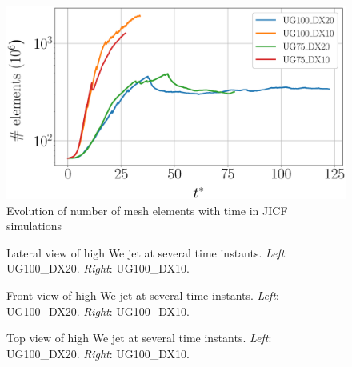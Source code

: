 \begin{figure}[ht]
\centering
	\centering
   \includegraphics[scale=0.25]{./part2_developments/figures_ch5_resolved_JICF/JICF_nelem_increase}
\caption{Evolution of number of mesh elements with time in JICF simulations}
\label{fig:JICF_nelem_increase}
\end{figure}

\clearpage

\begin{figure}[ht]
\centering
{}
\caption[Lateral view of high We jet at several time instants. ]{Lateral view of high We jet at several time instants. \textsl{Left}: UG100\_DX20. \textsl{Right}: UG100\_DX10.}
\label{fig:JICF_establishment_UG100_lateral}
\end{figure}

\clearpage

\begin{figure}[ht]
\centering
{}
\caption[Front view of high We jet at several time instants. ]{Front view of high We jet at several time instants. \textsl{Left}: UG100\_DX20. \textsl{Right}: UG100\_DX10.}
\label{fig:JICF_establishment_UG100_front}
\end{figure}
\clearpage

\clearpage

\begin{figure}[ht]
\centering
{}
\caption[Top view of high We jet at several time instants. ]{Top view of high We jet at several time instants. \textsl{Left}: UG100\_DX20. \textsl{Right}: UG100\_DX10.}
\label{fig:JICF_establishment_UG100_top}
\end{figure}




